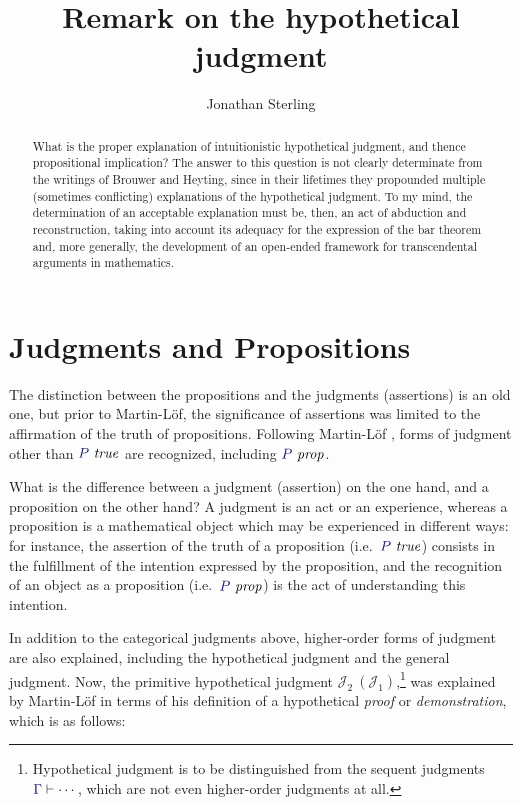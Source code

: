 \documentclass[11pt]{amsart}
\theoremstyle{definition}
\theoremstyle{remark}
\numberwithin{equation}{section}
\def\InputModeColorName{MidnightBlue}
\newcommand\InputMode[1]{{\color{\InputModeColorName}{#1}}}
\newcommand\HypJ[2]{#1\ (#2)}
\newcommand\JJ{\mathcal{J}}
\newcommand\IsTrue[1]{\InputMode{#1}\ \mathit{true}}
\newcommand\IsProp[1]{\InputMode{#1}\ \mathit{prop}}
\newcommand\Seq[2]{\InputMode{#1}\vdash #2}
\begin{document}
\title{Remark on the hypothetical judgment}

\author{Jonathan Sterling}
\address{}

\onehalfspacing

\begin{abstract}

What is the proper explanation of intuitionistic hypothetical judgment, and
thence propositional implication? The answer to this question is not clearly
determinate from the writings of Brouwer and Heyting, since in their lifetimes
they propounded multiple (sometimes conflicting) explanations of the
hypothetical judgment. To my mind, the determination of an acceptable
explanation must be, then, an act of abduction and reconstruction, taking
into account its adequacy for the expression of the bar theorem and, more
generally, the development of an open-ended framework for transcendental
arguments in mathematics.

\end{abstract}

\maketitle

\section{Judgments and Propositions}

The distinction between the propositions and the judgments (assertions) is an
old one, but prior to Martin-L\"of, the significance of assertions was limited
to the affirmation of the truth of propositions. Following Martin-L\"of
\cite{siena.lectures}, forms of judgment other than $\IsTrue{P}$ are recognized,
including $\IsProp{P}$.

What is the difference between a judgment (assertion) on the one hand, and a
proposition on the other hand? A judgment is an act or an experience, whereas a
proposition is a mathematical object which may be experienced in different ways:
for instance, the assertion of the truth of a proposition (i.e.\ $\IsTrue{P}$)
consists in the fulfillment of the intention expressed by the proposition, and
the recognition of an object as a proposition (i.e.\ $\IsProp{P}$) is the act of
understanding this intention.

In addition to the categorical judgments above, higher-order forms of judgment
are also explained, including the hypothetical judgment and the general
judgment. Now, the primitive hypothetical judgment
$\HypJ{\JJ_2}{\JJ_1}$,\footnote{Hypothetical judgment is to be distinguished
from the sequent judgments $\Seq{\Gamma}{\cdots}$, which are not even
higher-order judgments at all.} was explained by Martin-L\"of in terms of his
definition of a hypothetical \emph{proof} or \emph{demonstration}, which is as
follows:
\end{document}
